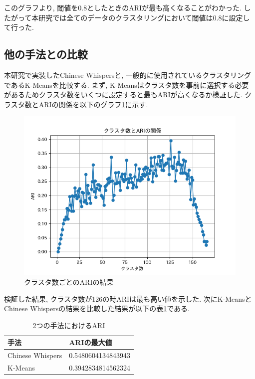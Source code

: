 このグラフより, 閾値を0.8としたときのARIが最も高くなることがわかった. したがって本研究では全てのデータのクラスタリングにおいて閾値は0.8に設定して行った. 

\subsection{他の手法との比較}
本研究で実装したChinese Whispersと, 一般的に使用されているクラスタリングであるK-Meansを比較する. まず, K-Meansはクラスタ数を事前に選択する必要があるためクラスタ数をいくつに設定すると最もARIが高くなるか検証した. 
クラスタ数とARIの関係を以下のグラフ\ref{fig:kmeans_graph}に示す.

\begin{figure}[hbtp]
  \centering
  \includegraphics[scale=0.8]
    {contents/images/kmeans_graph.png}
  \caption{クラスタ数ごとのARIの結果\label{fig:kmeans_graph}}
\end{figure}

検証した結果, クラスタ数が126の時ARIは最も高い値を示した. 次にK-MeansとChinese Whispersの結果を比較した結果が以下の表\ref{tb:two_ari}である. 

\begin{table}[htbp]
  \caption{2つの手法におけるARI}
  \label{tb:two_ari}
  \begin{center}
  \begin{tabularx}{\linewidth}{|X|X|}
    \hline
    手法&ARIの最大値\\\hline\hline
    Chinese Whispers&0.5480604134843943\\\hline
    K-Means&0.3942834814562324\\\hline
  \end{tabularx}\end{center}
\end{table}

